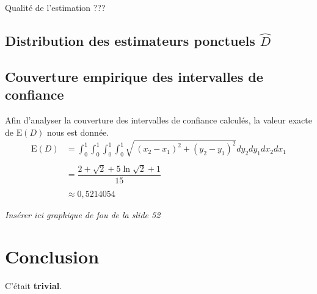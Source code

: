 \documentclass[paper=a4, fontsize=11pt]{scrartcl}
\begin{document}
Qualité de l'estimation ???

\subsection{Distribution des estimateurs ponctuels $\widehat{D}$}

\subsection{Couverture empirique des intervalles de confiance}

Afin d'analyser la couverture des intervalles de confiance calculés, la valeur exacte de $\text{E}(D)$ nous est donnée.
\begin{align*}
  \text{E}(D) &= \int _0^1\int _0^1\int _0^1\int _0^1\sqrt{\:\left(x_2-x_1\right)^2+\left(y_2-y_1\right)^2}dy_2dy_1dx_2dx_1 \\ \\
  &= \dfrac{2 + \sqrt{2} + 5\ln{\sqrt{2} + 1}}{15} \\ \\
  &\approx 0,5214054
\end{align*}

\textit{Insérer ici graphique de fou de la slide 52}

\section{Conclusion}

C'était \textbf{trivial}.
\end{document}
